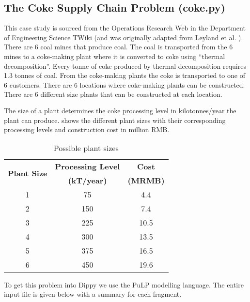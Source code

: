 \subsection{The Coke Supply Chain Problem (coke.py)} \label{sbs:coke}

This case study is sourced from the Operations Research Web in the Department of Engineering Science TWiki \cite{coke} (and was originally adapted from Leyland et al. \cite{geoff_coke}). There are 6 coal mines that produce coal. The coal is transported from the 6 mines to a coke-making plant where it is converted to coke using ``thermal decomposition''. Every tonne of coke produced by thermal decomposition requires 1.3 tonnes of coal. From the coke-making plants the coke is transported to one of 6 customers. There are 6 locations where coke-making plants can be constructed. There are 6 different size plants that can be constructed at each location.

The size of a plant determines the coke processing level in kilotonnes/year the plant can produce.  shows the different plant sizes with their corresponding processing levels and construction cost in million RMB.
\begin{table}[htp]
\begin{center}
\begin{tabular}{|c|c|c|}
\hline
\multirow{2}{*}{\bf Plant Size} & {\bf Processing Level} & {\bf Cost} \\
 & {\bf (kT/year)} & {\bf (MRMB)} \\
\hline
1 & 75 & 4.4 \\
2 & 150 & 7.4 \\
3 & 225 & 10.5 \\
4 & 300 & 13.5 \\
5 & 375 & 16.5 \\
6 & 450 & 19.6 \\
\hline
\end{tabular}
\caption{Possible plant sizes} \label{tab:plant_size}
\end{center}
\end{table}

To get this problem into Dippy we use the PuLP modelling language. The entire input file is given below with a summary for each fragment.

